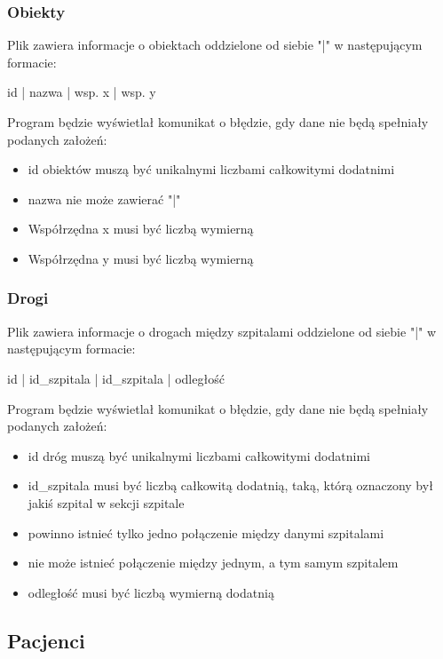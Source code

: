 \documentclass{article}
\begin{document}
\subsubsection{Obiekty}
Plik zawiera informacje o obiektach oddzielone od siebie "|" w następującym formacie:

id | nazwa | wsp. x | wsp. y

\vspace{0.5cm}
Program będzie wyświetlał komunikat o błędzie, gdy dane nie będą spełniały podanych założeń:

\begin{itemize}
\item id obiektów muszą być unikalnymi liczbami całkowitymi dodatnimi
\item nazwa nie może zawierać "|"
\item Współrzędna x musi być liczbą wymierną
\item Współrzędna y musi być liczbą wymierną
\end{itemize}



\subsubsection{Drogi}
Plik zawiera informacje o drogach między szpitalami oddzielone od siebie "|"  w następującym formacie:

id | id\_szpitala | id\_szpitala | odległość

\vspace{0.5cm}
Program będzie wyświetlał komunikat o błędzie, gdy dane nie będą spełniały podanych założeń:

\begin{itemize}
\item id dróg muszą być unikalnymi liczbami całkowitymi dodatnimi
\item id\_szpitala musi być liczbą całkowitą dodatnią, taką, którą oznaczony był jakiś szpital w sekcji szpitale
\item powinno istnieć tylko jedno połączenie między danymi szpitalami
\item nie może istnieć połączenie między jednym, a tym samym szpitalem 
\item odległość musi być liczbą wymierną dodatnią
\end{itemize}

\subsection{Pacjenci}
\end{document}
